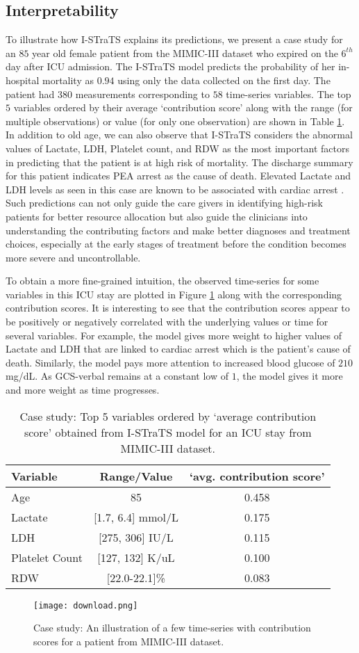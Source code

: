 \subsection{Interpretability}
To illustrate how I-STraTS explains its predictions, we present a case study for an $85$ year old female patient from the MIMIC-III dataset who expired on the $6^{th}$ day after ICU admission. The I-STraTS model predicts the probability of her in-hospital mortality as $0.94$ using only the data collected on the first day. The patient had $380$ measurements corresponding to $58$ time-series variables. The top $5$ variables ordered by their average `contribution score' along with the range (for multiple observations)  or value (for only one observation) are shown in Table \ref{tab:interp}. In addition to old age, we can also observe that I-STraTS considers the abnormal values of Lactate, LDH, Platelet count, and RDW as the most important factors in predicting that the patient is at high risk of mortality. The discharge summary for this patient indicates PEA arrest as the cause of death. Elevated Lactate and LDH levels as seen in this case are known to be associated with cardiac arrest \citep{dell2017prognostic, farhana2021biochemistry}.
Such predictions can not only guide the care givers in identifying high-risk patients for better resource allocation but also guide the clinicians into understanding the contributing factors and make better diagnoses and treatment choices, especially at the early stages of treatment before the condition becomes more severe and uncontrollable.

To obtain a more fine-grained intuition, the observed time-series for some variables in this ICU stay are plotted in Figure \ref{fig:interp} along with the corresponding contribution scores. It is interesting to see that the contribution scores appear to be positively or negatively correlated with the underlying values or time for several variables. For example, the model gives more weight to higher values of Lactate and LDH that are linked to cardiac arrest which is the patient's cause of death. Similarly, the model pays more attention to increased blood glucose of $210$ mg/dL. As GCS-verbal remains at a constant low of $1$, the model gives it more and more weight as time progresses. 


\begin{table}[]
\centering
\caption{Case study: Top 5 variables ordered by `average contribution score' obtained from I-STraTS model for an ICU stay from MIMIC-III dataset.}
\label{tab:interp}
\begin{tabular}{lcc}
\toprule
Variable &Range/Value &`avg. contribution score' \\
\midrule
Age &85 &0.458 \\
Lactate &[1.7, 6.4] mmol/L &0.175 \\
LDH &[275, 306] IU/L &0.115 \\
Platelet Count &[127, 132] K/uL &0.100 \\
RDW &[22.0-22.1]\% &0.083 \\
\bottomrule
    \end{tabular}
\end{table}

\begin{figure}
    \centering
    \texttt{[image: download.png]}
    \caption{Case study: An illustration of a few time-series with contribution scores for a patient from MIMIC-III dataset.}
    \label{fig:interp}
\end{figure}

